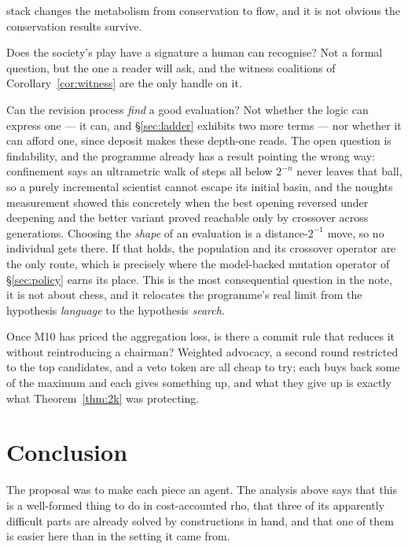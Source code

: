 \documentclass[11pt,a4paper]{article}
\theoremstyle{plain}
\theoremstyle{definition}
\theoremstyle{remark}
\newcommand{\rhoc}{\textsf{rho}}
\begin{document}
\begin{description}[leftmargin=2.4em,style=nextline]
stack changes the metabolism from conservation to flow, and it is not obvious
the conservation results survive.
\item[Q10] Does the society's play have a signature a human can recognise? Not
a formal question, but the one a reader will ask, and the witness coalitions of
Corollary~\ref{cor:witness} are the only handle on it.
\item[Q11] Can the revision process \emph{find} a good evaluation? Not whether
the logic can express one --- it can, and \S\ref{sec:ladder} exhibits two more
terms --- nor whether it can afford one, since deposit makes these depth-one
reads. The open question is findability, and the programme already has a result
pointing the wrong way: confinement says an ultrametric walk of steps all below
$2^{-n}$ never leaves that ball, so a purely incremental scientist cannot escape
its initial basin, and the noughts measurement showed this concretely when the
best opening reversed under deepening and the better variant proved reachable
only by crossover across generations. Choosing the \emph{shape} of an
evaluation is a distance-$2^{-1}$ move, so no individual gets there. If that
holds, the population and its crossover operator are the only route, which is
precisely where the model-backed mutation operator of \S\ref{sec:policy} earns
its place. This is the most consequential question in the note, it is not about
chess, and it relocates the programme's real limit from the hypothesis
\emph{language} to the hypothesis \emph{search}.
\item[Q12] Once M10 has priced the aggregation loss, is there a commit rule that
reduces it without reintroducing a chairman? Weighted advocacy, a second round
restricted to the top candidates, and a veto token are all cheap to try; each
buys back some of the maximum and each gives something up, and what they give up
is exactly what Theorem~\ref{thm:2k} was protecting.
\end{description}

\section{Conclusion}
\label{sec:conclusion}

The proposal was to make each piece an agent. The analysis above says that this
is a well-formed thing to do in cost-accounted \rhoc, that three of its
apparently difficult parts are already solved by constructions in hand, and that
one of them is easier here than in the setting it came from.
\end{document}

